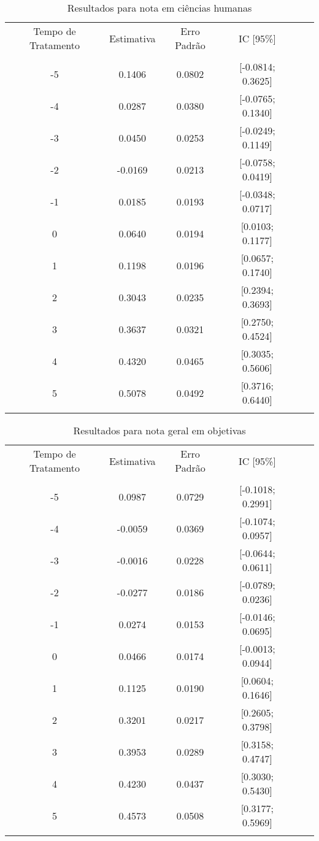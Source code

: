 \documentclass[
        12pt,                           %
        openright,                      %
        oneside,
        a4paper,                        %
        chapter=TITLE,         %
        section=TITLE,         %
        subsection=Title,      %
        english,                        %
        spanish,                        %
        portugues,                      %
        ]{abntex2}
\begin{document}
{\begin{apendicesenv}
\begin{table}[htbp]
\caption{Resultados para nota em ciências humanas}
\centering
\begin{tabular}{cccccc}
\\ \hline
Tempo de Tratamento & Estimativa & Erro Padrão & IC [95\%] \\
\\ \hline
-5 & 0.1406 & 0.0802 & [-0.0814; 0.3625] \\
-4 & 0.0287 & 0.0380 & [-0.0765; 0.1340] \\
-3 & 0.0450 & 0.0253 & [-0.0249; 0.1149] \\
-2 & -0.0169 & 0.0213 & [-0.0758; 0.0419] \\
-1 & 0.0185 & 0.0193 & [-0.0348; 0.0717] \\
0 & 0.0640 & 0.0194 & [0.0103; 0.1177] \\
1 & 0.1198 & 0.0196 & [0.0657; 0.1740] \\
2 & 0.3043 & 0.0235 & [0.2394; 0.3693] \\
3 & 0.3637 & 0.0321 & [0.2750; 0.4524] \\
4 & 0.4320 & 0.0465 & [0.3035; 0.5606] \\
5 & 0.5078 & 0.0492 & [0.3716; 0.6440] \\
\\ \hline
\end{tabular}
\label{tab:resultados_humanas}
\end{table}

\begin{table}[htbp]
\caption{Resultados para nota geral em objetivas}
\centering
\begin{tabular}{cccccc}
\\ \hline
Tempo de Tratamento & Estimativa & Erro Padrão & IC [95\%] \\
\\ \hline
-5 & 0.0987 & 0.0729 & [-0.1018; 0.2991] \\
-4 & -0.0059 & 0.0369 & [-0.1074; 0.0957] \\
-3 & -0.0016 & 0.0228 & [-0.0644; 0.0611] \\
-2 & -0.0277 & 0.0186 & [-0.0789; 0.0236] \\
-1 & 0.0274 & 0.0153 & [-0.0146; 0.0695] \\
0 & 0.0466 & 0.0174 & [-0.0013; 0.0944] \\
1 & 0.1125 & 0.0190 & [0.0604; 0.1646] \\
2 & 0.3201 & 0.0217 & [0.2605; 0.3798] \\
3 & 0.3953 & 0.0289 & [0.3158; 0.4747] \\
4 & 0.4230 & 0.0437 & [0.3030; 0.5430] \\
5 & 0.4573 & 0.0508 & [0.3177; 0.5969] \\
\\ \hline
\end{tabular}
\label{tab:resultados_objetiva}
\end{table}


\end{apendicesenv}}
\end{document}
